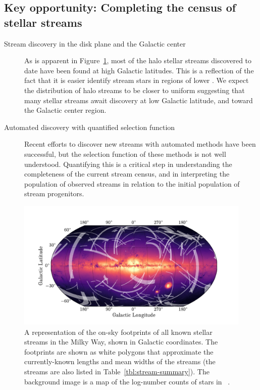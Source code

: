 \documentclass[final,5p,times,twocolumn,authoryear]{elsarticle}
\begin{document}
\subsection{Key opportunity: Completing the census of stellar streams}
\begin{description}
    \item[Stream discovery in the disk plane and the Galactic center] As is apparent in
    Figure~\ref{fig:sky-map}, most of the halo stellar streams discovered to date have
    been found at high Galactic latitudes. This is a reflection of the fact that it is
    easier identify stream stars in regions of lower . We
    expect the distribution of halo streams to be closer to uniform suggesting that many
    stellar streams await discovery at low Galactic latitude, and toward the Galactic
    center region.
    \item[Automated discovery with quantified selection function] Recent efforts to
    discover new streams with automated methods have been successful, but the selection
    function of these methods is not well understood. Quantifying this is a critical
    step in understanding the completeness of the current stream census, and in
    interpreting the population of observed streams in relation to the initial
    population of stream progenitors.
\end{description}


\begin{figure}[t!]
\begin{center}
\includegraphics[width=1\textwidth]{stream-sky-map.pdf}
\end{center}
\caption{%
A representation of the on-sky footprints of all known stellar streams in the Milky Way,
shown in Galactic coordinates.
The footprints are shown as white polygons that approximate the currently-known lengths
and mean widths of the streams (the streams are also listed in
Table~\ref{tbl:stream-summary}).
The background image is a map of the log-number counts of stars in \gaia\ .
}
\label{fig:sky-map}
\end{figure}
\end{document}
